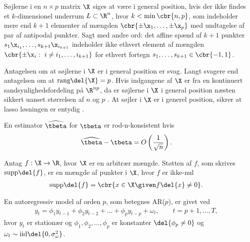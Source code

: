%
\begin{defn} \label{defn:general_position}
Søjlerne i en \(n \times p\) matrix \(\X\) siges at være i general position, hvis der ikke findes et  \(k\)-dimensionel underrum \(L \subset \R^n\), hvor \(k < \min \cbr{n,p}\), som indeholder mere end \(k+1\) elementer af mængden \(\cbr{\pm \x_1, \ldots, \pm \x_p}\) med undtagelse af par af antipodal punkter.
Sagt med andre ord: det affine spænd af \(k+1\) punkter \(s_1 \x_{i_1}, \ldots, s_{k+1} \x_{i_{k+1}}\) indeholder ikke ethvert element af mængden \(\cbr{\pm \x_i : \ i \neq i_1, \ldots, i_{k+1}}\) for ethvert fortegn \(s_1, \ldots, s_{k+1} \in \cbr{-1,1}\).
\end{defn}
%
Antagelsen om at søjlerne i \(\X\) er i general position er svag.
Langt svagere end antagelsen om at \(\text{rang} \del{\X} = p\).
Hvis indgangene af \(\X\) er fra en kontinuert sandsynlighedsfordeling på \(\R^{np}\), da er søjlerne i \(\X\) i general position næsten sikkert uanset størrelsen af \(n\) og \(p\) \citep{lasso_unique}. 
At søjler i \(\X\) er i generel position, sikrer at lasso løsningen er entydig \citep{lasso_unique}.
%
\begin{defn} \label{def:rodn}
En estimator \(\widehat{\tbeta}\) for \(\tbeta\) er rod-n-konsistent hvis
\begin{align*}
\widehat{\tbeta}  - \tbeta = O \left( \frac{1}{\sqrt{n}} \right).
\end{align*}
\end{defn}
%
\begin{defn} \label{defn:supp}
Antag \(f: \X \rightarrow \R\), hvor \(\X\) er en arbitrær mængde.
Støtten af \(f\), som skrives \(\text{supp} \del{f}\), er en mængde af punkter i \(\X\), hvor \(f\) er ikke-nul
\begin{align*}
\text{supp} \del{f} = \cbr{x \in \X \given f \del{x} \neq 0}.
\end{align*}
\end{defn}
%
%
\begin{defn} \label{def:ar}
En autoregressiv model af orden $p$, som betegnes AR($p$), er givet ved
\begin{align*}
y_t = \phi_1 y_{t-1} + \phi_2 y_{t-2} + \dots + \phi_p y_{t-p} + \omega_t, \qquad t = p+1, \dots, T,  
\end{align*}
hvor $y_t$ er stationær og $\phi_1 , \phi_2, \dots, \phi_p $ er konstanter  $\del{ \phi_p \neq 0}$ og $\omega_t \sim \text{iid}\del{0, \sigma_\omega^2}$.  
\end{defn}
